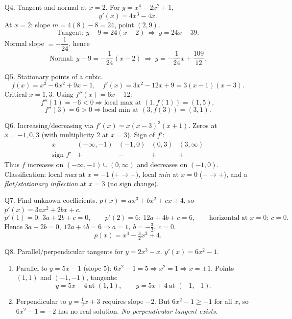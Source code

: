 \documentclass[11pt]{article}
\def\textbf#1{#1}%
\begin{document}
\begin{solution}
\textbf{Q4. Tangent and normal at $x=2$.}
For $y=x^{4}-2x^{2}+1$,
\[
y'(x)=4x^{3}-4x.
\]
At $x=2$: slope $m=4(8)-8=24$, point $(2,9)$.
\[
\text{Tangent: }y-9=24(x-2)\ \Rightarrow\ \boxed{y=24x-39}.
\]
Normal slope $=-\dfrac{1}{24}$, hence
\[
\text{Normal: }y-9=-\frac{1}{24}(x-2)\ \Rightarrow\ \boxed{y=-\frac{1}{24}x+\frac{109}{12}}.
\]
\end{solution}

\begin{solution}
\textbf{Q5. Stationary points of a cubic.}
\[
f(x)=x^{3}-6x^{2}+9x+1,\quad f'(x)=3x^{2}-12x+9=3(x-1)(x-3).
\]
Critical $x=\boxed{1,3}$. Using $f''(x)=6x-12$:
\[
f''(1)=-6<0 \Rightarrow \text{local max at }(1,f(1))=(1,5),
\]
\[
f''(3)=6>0 \Rightarrow \text{local min at }(3,f(3))=(3,1).
\]
\end{solution}

\begin{solution}
\textbf{Q6. Increasing/decreasing via $f'(x)=x(x-3)^{2}(x+1)$.}
Zeros at $x=-1,0,3$ (with multiplicity $2$ at $x=3$).  
Sign of $f'$:
\[
\begin{array}{c|cccc}
x & (-\infty,-1) & (-1,0) & (0,3) & (3,\infty)\\\hline
\text{sign }f' & + & - & + & +
\end{array}
\]
Thus $f$ increases on $(-\infty,-1)\cup(0,\infty)$ and decreases on $(-1,0)$.  
Classification: local \emph{max} at $x=-1$ ($+\to-$), local \emph{min} at $x=0$ ($-\to+$), and a \emph{flat/stationary inflection} at $x=3$ (no sign change).
\end{solution}

\begin{solution}
\textbf{Q7. Find unknown coefficients.}
$p(x)=ax^{3}+bx^{2}+cx+4$, so $p'(x)=3ax^{2}+2bx+c$.
\[
p'(1)=0:\ 3a+2b+c=0,\qquad
p'(2)=6:\ 12a+4b+c=6,\qquad
\text{horizontal at }x=0:\ c=0.
\]
Hence $3a+2b=0,\ 12a+4b=6\Rightarrow a=1,\ b=-\tfrac{3}{2},\ c=0$.  
\[
\boxed{p(x)=x^{3}-\tfrac{3}{2}x^{2}+4}.
\]
\end{solution}

\begin{solution}
\textbf{Q8. Parallel/perpendicular tangents for $y=2x^{3}-x$.}
$y'(x)=6x^{2}-1$.
\begin{enumerate}
  \item Parallel to $y=5x-1$ (slope $5$): $6x^{2}-1=5\Rightarrow x^{2}=1\Rightarrow x=\pm1$.  
  Points $(1,1)$ and $(-1,-1)$, tangents:
  \[
  \boxed{y=5x-4}\ \text{at }(1,1),\qquad \boxed{y=5x+4}\ \text{at }(-1,-1).
  \]
  \item Perpendicular to $y=\tfrac12x+3$ requires slope $-2$.  
  But $6x^{2}-1\ge -1$ for all $x$, so $6x^{2}-1=-2$ has no real solution.  
  \emph{No perpendicular tangent exists.}
\end{enumerate}
\end{solution}
\end{document}
